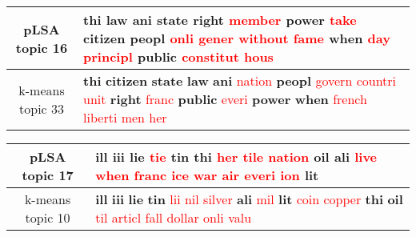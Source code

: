 \begin{center}\begin{tabularx}{\textwidth} {
  | c | >{\raggedright\arraybackslash}X | } \hline 
pLSA topic 16 & \textbf{thi} \textbf{law} \textbf{ani} \textbf{state} \textbf{right} \textcolor{red}{member} \textbf{power} \textcolor{red}{take} \textbf{citizen} \textbf{peopl} \textcolor{red}{onli} \textcolor{red}{gener} \textcolor{red}{without} \textcolor{red}{fame} \textbf{when} \textcolor{red}{day} \textcolor{red}{principl} \textbf{public} \textcolor{red}{constitut} \textcolor{red}{hous} \\ \hline 
k-means topic 33 & \textbf{thi} \textbf{citizen} \textbf{state} \textbf{law} \textbf{ani} \textcolor{red}{nation} \textbf{peopl} \textcolor{red}{govern} \textcolor{red}{countri} \textcolor{red}{unit} \textbf{right} \textcolor{red}{franc} \textbf{public} \textcolor{red}{everi} \textbf{power} \textbf{when} \textcolor{red}{french} \textcolor{red}{liberti} \textcolor{red}{men} \textcolor{red}{her} \\ \hline 
\end{tabularx}

\end{center}

\begin{center}\begin{tabularx}{\textwidth} {
  | c | >{\raggedright\arraybackslash}X | } \hline 
pLSA topic 17 & \textbf{ill} \textbf{iii} \textbf{lie} \textcolor{red}{tie} \textbf{tin} \textbf{thi} \textcolor{red}{her} \textcolor{red}{tile} \textcolor{red}{nation} \textbf{oil} \textbf{ali} \textcolor{red}{live} \textcolor{red}{when} \textcolor{red}{franc} \textcolor{red}{ice} \textcolor{red}{war} \textcolor{red}{air} \textcolor{red}{everi} \textcolor{red}{ion} \textbf{lit} \\ \hline 
k-means topic 10 & \textbf{ill} \textbf{iii} \textbf{lie} \textbf{tin} \textcolor{red}{lii} \textcolor{red}{nil} \textcolor{red}{silver} \textbf{ali} \textcolor{red}{mil} \textbf{lit} \textcolor{red}{coin} \textcolor{red}{copper} \textbf{thi} \textbf{oil} \textcolor{red}{til} \textcolor{red}{articl} \textcolor{red}{fall} \textcolor{red}{dollar} \textcolor{red}{onli} \textcolor{red}{valu} \\ \hline 
\end{tabularx}

\end{center}

